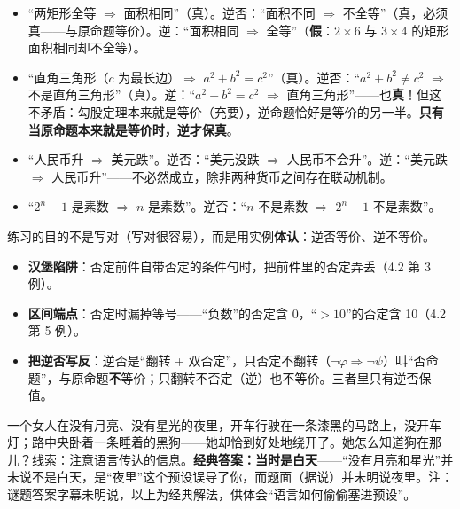\documentclass[UTF8,a4paper,11pt]{ctexart}
\begin{document}
\begin{itemize}
  \item “两矩形全等 $\Rightarrow$ 面积相同”（真）。逆否：“面积不同 $\Rightarrow$ 不全等”（真，必须真——与原命题等价）。逆：“面积相同 $\Rightarrow$ 全等”（\textbf{假}：$2 \times 6$ 与 $3 \times 4$ 的矩形面积相同却不全等）。
  \item “直角三角形（$c$ 为最长边）$\Rightarrow$ $a^2 + b^2 = c^2$”（真）。逆否：“$a^2 + b^2 \neq c^2$ $\Rightarrow$ 不是直角三角形”（真）。逆：“$a^2 + b^2 = c^2$ $\Rightarrow$ 直角三角形”——也\textbf{真}！但这不矛盾：勾股定理本来就是等价（充要），逆命题恰好是等价的另一半。\textbf{只有当原命题本来就是等价时，逆才保真}。
  \item “人民币升 $\Rightarrow$ 美元跌”。逆否：“美元没跌 $\Rightarrow$ 人民币不会升”。逆：“美元跌 $\Rightarrow$ 人民币升”——不必然成立，除非两种货币之间存在联动机制。
  \item “$2^n - 1$ 是素数 $\Rightarrow$ $n$ 是素数”。逆否：“$n$ 不是素数 $\Rightarrow$ $2^n - 1$ 不是素数”。
\end{itemize}

练习的目的不是写对（写对很容易），而是用实例\textbf{体认}：逆否等价、逆不等价。

\begin{keyconcept}
\begin{itemize}
  \item \textbf{汉堡陷阱}：否定前件自带否定的条件句时，把前件里的否定弄丢（4.2 第 3 例）。
  \item \textbf{区间端点}：否定时漏掉等号——“负数”的否定含 0，“$>10$”的否定含 10（4.2 第 5 例）。
  \item \textbf{把逆否写反}：逆否是“翻转 + 双否定”，只否定不翻转（$\neg \varphi \Rightarrow \neg \psi$）叫“否命题”，与原命题\textbf{不}等价；只翻转不否定（逆）也不等价。三者里只有逆否保值。
\end{itemize}
\end{keyconcept}

\begin{calcbox}
一个女人在没有月亮、没有星光的夜里，开车行驶在一条漆黑的马路上，没开车灯；路中央卧着一条睡着的黑狗——她却恰到好处地绕开了。她怎么知道狗在那儿？线索：注意语言传达的信息。\textbf{经典答案：当时是白天}——“没有月亮和星光”并未说不是白天，是“夜里”这个预设误导了你，而题面（据说）并未明说夜里。注：谜题答案字幕未明说，以上为经典解法，供体会“语言如何偷偷塞进预设”。
\end{calcbox}
\end{document}
